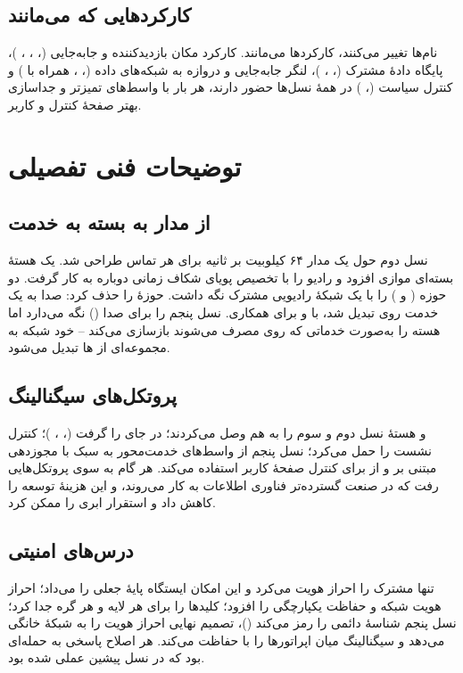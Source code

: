 \documentclass[11pt,a4paper]{article}
\begin{document}
\subsection{کارکردهایی که می‌مانند}
نام‌ها تغییر می‌کنند، کارکردها می‌مانند. کارکرد مکان بازدیدکننده و جابه‌جایی (، ، ، )، پایگاه دادهٔ مشترک
(، ، )، لنگر جابه‌جایی و دروازه به شبکه‌های داده (، ،  همراه با ) و کنترل سیاست
(، ) در همهٔ نسل‌ها حضور دارند، هر بار با واسط‌های تمیزتر و جداسازی بهتر صفحهٔ کنترل و کاربر.

\section{توضیحات فنی تفصیلی}

\subsection{از مدار به بسته به خدمت}
نسل دوم حول یک مدار ۶۴ کیلوبیت بر ثانیه برای هر تماس طراحی شد.  یک هستهٔ بسته‌ای موازی افزود و رادیو را با تخصیص پویای
شکاف زمانی دوباره به کار گرفت.  دو حوزه ( و ) را با یک شبکهٔ رادیویی مشترک نگه داشت.  حوزهٔ  را حذف
کرد: صدا به یک خدمت  روی  تبدیل شد، با  و  برای همکاری. نسل پنجم  را برای صدا ()
نگه می‌دارد اما هسته را به‌صورت خدماتی که روی  مصرف می‌شوند بازسازی می‌کند -- خود شبکه به مجموعه‌ای از ها تبدیل می‌شود.

\subsection{پروتکل‌های سیگنالینگ}
 و  هستهٔ نسل دوم و سوم را به هم وصل می‌کردند؛  در  جای  را گرفت (، ، )؛
 کنترل نشست را حمل می‌کرد؛ نسل پنجم از واسط‌های خدمت‌محور به سبک  با مجوزدهی مبتنی بر  و از  برای
کنترل صفحهٔ کاربر استفاده می‌کند. هر گام به سوی پروتکل‌هایی رفت که در صنعت گسترده‌تر فناوری اطلاعات به کار می‌روند، و این هزینهٔ توسعه را کاهش
داد و استقرار ابری را ممکن کرد.

\subsection{درس‌های امنیتی}
 تنها مشترک را احراز هویت می‌کرد و این امکان ایستگاه پایهٔ جعلی را می‌داد؛  احراز هویت شبکه و حفاظت یکپارچگی را افزود؛
 کلیدها را برای هر لایه و هر گره جدا کرد؛ نسل پنجم شناسهٔ دائمی را رمز می‌کند ()، تصمیم نهایی احراز هویت را به شبکهٔ خانگی
می‌دهد و سیگنالینگ میان اپراتورها را با  حفاظت می‌کند. هر اصلاح پاسخی به حمله‌ای بود که در نسل پیشین عملی شده بود.
\end{document}
